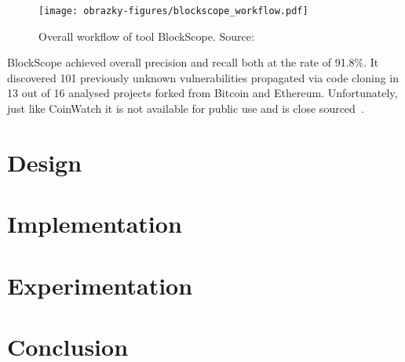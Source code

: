     \begin{figure}[h]
      \centering
      \texttt{[image: obrazky-figures/blockscope\_workflow.pdf]}
      \caption{Overall workflow of tool BlockScope. Source:~\cite{BlockScope}}
      \label{blockscopeworkflow}
    \end{figure}

    BlockScope achieved overall precision and recall both at the rate of 91.8\%. It discovered 101 previously
    unknown vulnerabilities propagated via code cloning in 13 out of 16 analysed projects forked from Bitcoin
    and Ethereum. Unfortunately, just like CoinWatch it is not available for public use and is
    close sourced~\cite{BlockScope}.



\chapter{Design}
\label{chapter:design}


\chapter{Implementation}
\label{chapter:implementation}


\chapter{Experimentation}
\label{chapter:experimentation}


\chapter{Conclusion}
\label{chapter:conclusion}
